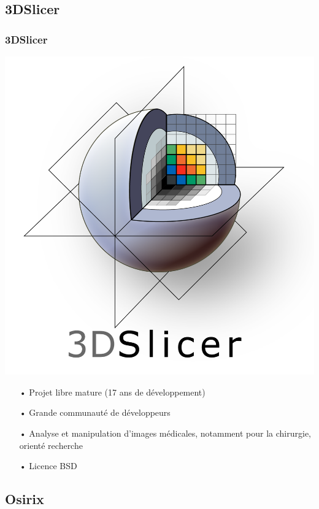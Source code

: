 \documentclass[11pt]{beamer}
\begin{document}
\subsection{3DSlicer}

\begin{frame}
\frametitle{3DSlicer}
\includegraphics[scale=0.06]{Slicer.png}
\begin{itemize}[<+->]
\item[•] Projet libre mature (17 ans de développement)
\item[•] Grande communauté de développeurs
\item[•] Analyse et manipulation d'images médicales, notamment pour la chirurgie, orienté recherche
\item[•] Licence BSD

\end{itemize}
\end{frame}

\subsection{Osirix}
\end{document}

